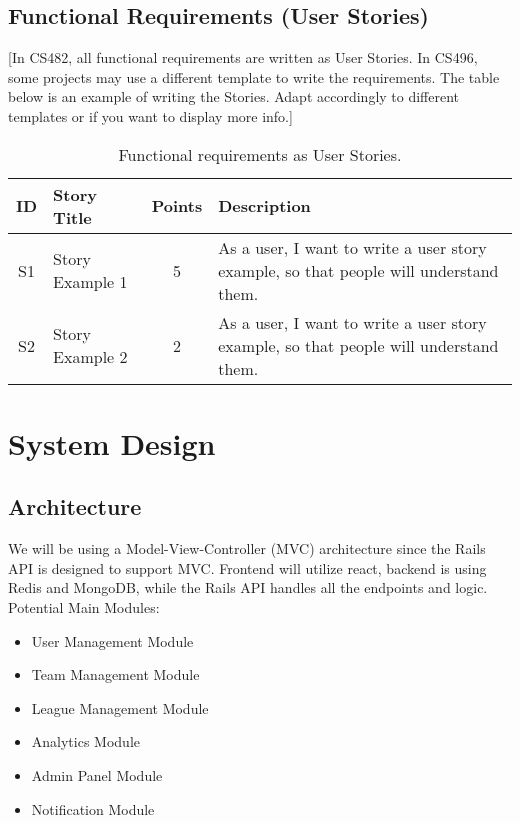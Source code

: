 \documentclass{article}
\begin{document}
\subsection{Functional Requirements (User Stories)}
[In CS482, all functional requirements are written as User Stories. In CS496, some projects may use a different template to write the requirements. The table below is an example of writing the Stories. Adapt accordingly to different templates or if you want to display more info.]

\begin{table}[h!]
\centering
\begin{tabular}{c l c p{10cm}}
\hline
\textbf{ID} & \textbf{Story Title} & \textbf{Points} & \textbf{Description} \\
\hline
S1 & Story Example 1 & 5 & As a user, I want to write a user story example, so that people will understand them. \\ \hline
S2 & Story Example 2 & 2 & As a user, I want to write a user story example, so that people will understand them. \\ \hline

\end{tabular}
\caption{Functional requirements as User Stories.}
\end{table}

\section{System Design}

\subsection{Architecture}
We will be using a Model-View-Controller (MVC) architecture since the Rails API is designed to support MVC. Frontend will utilize react, backend is using Redis and MongoDB, while the Rails API handles all the endpoints and logic.\\
Potential Main Modules:
\begin{itemize}
    \item User Management Module
    \item Team Management Module
    \item League Management Module
    \item Analytics Module
    \item Admin Panel Module
    \item Notification Module
\end{itemize}
\end{document}

